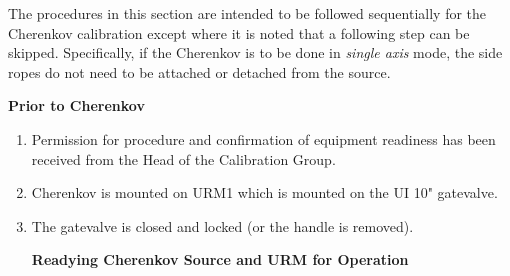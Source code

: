 The procedures in this section are intended to be followed sequentially for the Cherenkov calibration except where it is noted that a following step can be skipped. Specifically, if the Cherenkov is to be done in {\it single axis} mode, the side ropes do not need to be attached or detached from the source.

{\bf Prior to Cherenkov}

\begin{enumerate}
\item \CheckBox[name=li8p1]{} Permission for procedure and confirmation of equipment readiness has been received from the Head of the Calibration Group.
\item \CheckBox[name=li8p2]{} Cherenkov is mounted on URM1 which is mounted on the UI 10" gatevalve.
\item \CheckBox[name=li8p3]{} The gatevalve is closed and locked (or the handle is removed).

{\bf Readying Cherenkov Source and URM for Operation}


\end{enumerate}
